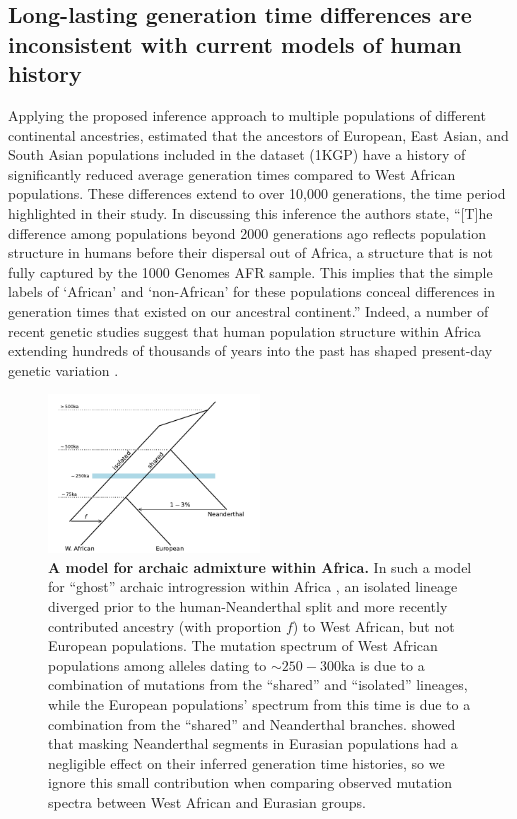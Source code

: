 \documentclass[]{article}
\begin{document}
\subsection*{Long-lasting generation time differences are inconsistent with
current models of human history}

Applying the proposed inference approach to multiple populations of different
continental ancestries, \citet{wang2023human} estimated that the ancestors of
European, East Asian, and South Asian populations included in the
\citet{1000genomes2015} dataset (1KGP) have a history of significantly reduced
average generation times compared to West African populations. These
differences extend to over 10,000 generations, the time period highlighted in
their study.
In discussing this inference the authors state, ``[T]he difference
among populations beyond 2000 generations ago reflects population structure in
humans before their dispersal out of Africa, a structure that is not fully
captured by the 1000 Genomes AFR sample. This implies that the simple labels of
`African' and `non-African' for these populations conceal differences in
generation times that existed on our ancestral continent.'' Indeed, a number of
recent genetic studies suggest that human population structure within Africa
extending hundreds of thousands of years into the past has shaped
present-day genetic variation
\citep{hammer2011genetic,hsieh2016model,hey2018phylogeny,
ragsdale2019models,lorente2019whole,durvasula2020recovering}.

\begin{figure}[t!]
    \centering
    \includegraphics[width=0.5\textwidth]{../plots/durvasula_model}
    \caption{
        \textbf{A model for archaic admixture within Africa.} In such a model
        for ``ghost'' archaic introgression within Africa
        \citep{durvasula2020recovering}, an isolated lineage diverged prior to
        the human-Neanderthal split and more recently contributed ancestry
        (with proportion $f$) to West African, but not European populations.
        The mutation spectrum of West African populations among alleles dating
        to $\sim250-300$ka is due to a combination of mutations from the
        ``shared'' and ``isolated'' lineages, while the European populations'
        spectrum from this time is due to a combination from the ``shared'' and
        Neanderthal branches.  \citet{wang2023human} showed that masking
        Neanderthal segments in Eurasian populations had a negligible effect on
        their inferred generation time histories, so we ignore this small
        contribution when comparing observed mutation spectra between West
        African and Eurasian groups.
    }
    \label{fig:durvasula-model}
\end{figure}
\end{document}
